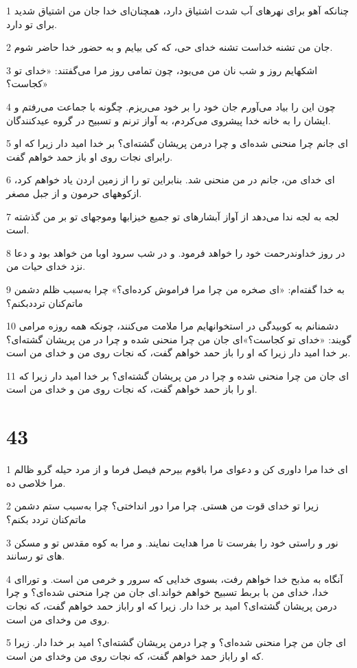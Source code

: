 \par 1 چنانکه آهو برای نهرهای آب شدت اشتیاق دارد، همچنان‌ای خدا جان من اشتیاق شدید برای تو دارد.
\par 2 جان من تشنه خداست تشنه خدای حی، که کی بیایم و به حضور خدا حاضر شوم.
\par 3 اشکهایم روز و شب نان من می‌بود، چون تمامی روز مرا می‌گفتند: «خدای تو کجاست؟»
\par 4 چون این را بیاد می‌آورم جان خود را بر خود می‌ریزم. چگونه با جماعت می‌رفتم و ایشان را به خانه خدا پیشروی می‌کردم، به آواز ترنم و تسبیح در گروه عیدکنندگان.
\par 5 ‌ای جانم چرا منحنی شده‌ای و چرا درمن پریشان گشته‌ای؟ بر خدا امید دار زیرا که او رابرای نجات روی او باز حمد خواهم گفت.
\par 6 ‌ای خدای من، جانم در من منحنی شد. بنابراین تو را از زمین اردن یاد خواهم کرد، ازکوههای حرمون و از جبل مصغر.
\par 7 لجه به لجه ندا می‌دهد از آواز آبشارهای تو جمیع خیزابها وموجهای تو بر من گذشته است.
\par 8 در روز خداوندرحمت خود را خواهد فرمود. و در شب سرود اوبا من خواهد بود و دعا نزد خدای حیات من.
\par 9 به خدا گفته‌ام: «ای صخره من چرا مرا فراموش کرده‌ای؟» چرا به‌سبب ظلم دشمن ماتم‌کنان ترددبکنم؟
\par 10 دشمنانم به کوبیدگی در استخوانهایم مرا ملامت می‌کنند، چونکه همه روزه مرامی گویند: «خدای تو کجاست؟»‌ای جان من چرا منحنی شده و چرا در من پریشان گشته‌ای؟ بر خدا امید دار زیرا که او را باز حمد خواهم گفت، که نجات روی من و خدای من است.
\par 11 ‌ای جان من چرا منحنی شده و چرا در من پریشان گشته‌ای؟ بر خدا امید دار زیرا که او را باز حمد خواهم گفت، که نجات روی من و خدای من است.
 
\chapter{43}

\par 1 ای خدا مرا داوری کن و دعوای مرا باقوم بیرحم فیصل فرما و از مرد حیله گرو ظالم مرا خلاصی ده.
\par 2 زیرا تو خدای قوت من هستی. چرا مرا دور انداختی؟ چرا به‌سبب ستم دشمن ماتم‌کنان تردد بکنم؟
\par 3 نور و راستی خود را بفرست تا مرا هدایت نمایند. و مرا به کوه مقدس تو و مسکن های تو رسانند.
\par 4 آنگاه به مذبح خدا خواهم رفت، بسوی خدایی که سرور و خرمی من است. و تورا‌ای خدا، خدای من با بربط تسبیح خواهم خواند.‌ای جان من چرا منحنی شده‌ای؟ و چرا درمن پریشان گشته‌ای؟ امید بر خدا دار. زیرا که او راباز حمد خواهم گفت، که نجات روی من وخدای من است.
\par 5 ‌ای جان من چرا منحنی شده‌ای؟ و چرا درمن پریشان گشته‌ای؟ امید بر خدا دار. زیرا که او راباز حمد خواهم گفت، که نجات روی من وخدای من است.
 
